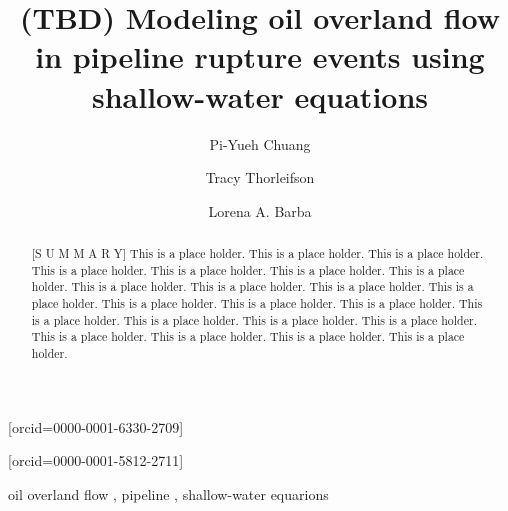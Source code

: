 
\title[mode=title]{(TBD) Modeling oil overland flow in pipeline rupture events using shallow-water equations}

\author[1]{Pi-Yueh Chuang}[orcid=0000-0001-6330-2709]

\author[2]{Tracy Thorleifson}

\author[1]{Lorena A. Barba}[orcid=0000-0001-5812-2711]
\cormark[1] 


\address[1]{Department of Mechanical and Aerospace Engineering, The George Washington University, Washington, DC, USA}
\address[2]{G2 Integrated Solutions, Houston, TX 77042, USA}

\begin{abstract}[S U M M A R Y]
    This is a place holder.
    This is a place holder.
    This is a place holder.
    This is a place holder.
    This is a place holder.
    This is a place holder.
    This is a place holder.
    This is a place holder.
    This is a place holder.
    This is a place holder.
    This is a place holder.
    This is a place holder.
    This is a place holder.
    This is a place holder.
    This is a place holder.
    This is a place holder.
    This is a place holder.
    This is a place holder.
    This is a place holder.
    This is a place holder.
    This is a place holder.
    This is a place holder.
\end{abstract}

\begin{keywords}
    oil overland flow \sep
    pipeline \sep
    shallow-water equarions
\end{keywords}


